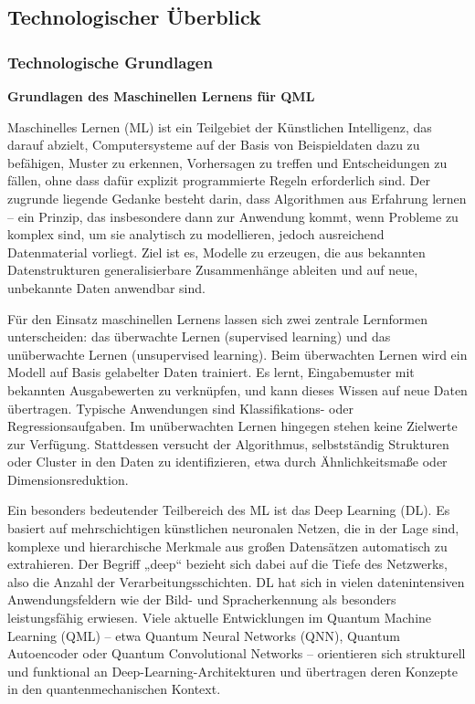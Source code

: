 \subsection{Technologischer Überblick}

\subsubsection{Technologische Grundlagen}

\noindent\textbf{Grundlagen des Maschinellen Lernens für QML}  

\noindent  
Maschinelles Lernen (ML) ist ein Teilgebiet der Künstlichen Intelligenz, das darauf abzielt, Computersysteme auf der Basis von Beispieldaten dazu zu befähigen, Muster zu erkennen, Vorhersagen zu treffen und Entscheidungen zu fällen, ohne dass dafür explizit programmierte Regeln erforderlich sind. Der zugrunde liegende Gedanke besteht darin, dass Algorithmen aus Erfahrung lernen – ein Prinzip, das insbesondere dann zur Anwendung kommt, wenn Probleme zu komplex sind, um sie analytisch zu modellieren, jedoch ausreichend Datenmaterial vorliegt. Ziel ist es, Modelle zu erzeugen, die aus bekannten Datenstrukturen generalisierbare Zusammenhänge ableiten und auf neue, unbekannte Daten anwendbar sind. \cite{alpaydin_introduction_2020}

\noindent  
Für den Einsatz maschinellen Lernens lassen sich zwei zentrale Lernformen unterscheiden: das überwachte Lernen (supervised learning) und das unüberwachte Lernen (unsupervised learning). Beim überwachten Lernen wird ein Modell auf Basis gelabelter Daten trainiert. Es lernt, Eingabemuster mit bekannten Ausgabewerten zu verknüpfen, und kann dieses Wissen auf neue Daten übertragen. Typische Anwendungen sind Klassifikations- oder Regressionsaufgaben. Im unüberwachten Lernen hingegen stehen keine Zielwerte zur Verfügung. Stattdessen versucht der Algorithmus, selbstständig Strukturen oder Cluster in den Daten zu identifizieren, etwa durch Ähnlichkeitsmaße oder Dimensionsreduktion. \cite{ertel_grundkurs_2025}

\noindent  
Ein besonders bedeutender Teilbereich des ML ist das Deep Learning (DL). Es basiert auf mehrschichtigen künstlichen neuronalen Netzen, die in der Lage sind, komplexe und hierarchische Merkmale aus großen Datensätzen automatisch zu extrahieren. Der Begriff „deep“ bezieht sich dabei auf die Tiefe des Netzwerks, also die Anzahl der Verarbeitungsschichten. DL hat sich in vielen datenintensiven Anwendungsfeldern wie der Bild- und Spracherkennung als besonders leistungsfähig erwiesen. Viele aktuelle Entwicklungen im Quantum Machine Learning (QML) – etwa Quantum Neural Networks (QNN), Quantum Autoencoder oder Quantum Convolutional Networks – orientieren sich strukturell und funktional an Deep-Learning-Architekturen und übertragen deren Konzepte in den quantenmechanischen Kontext. \cite{kreutzer2019} 

